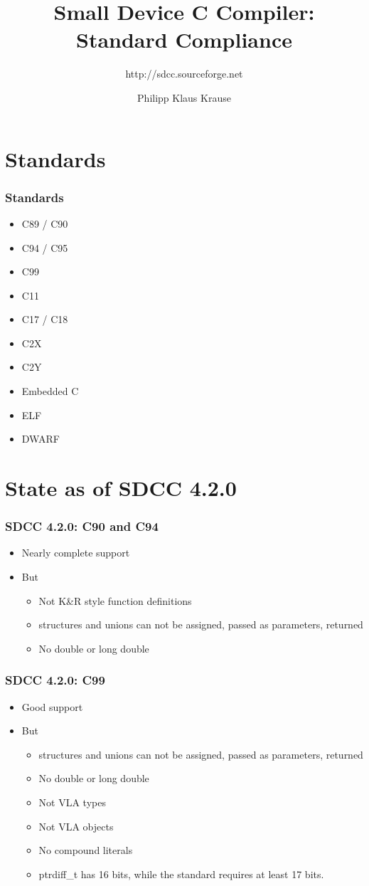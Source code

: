 \documentclass[xcolor=dvipsnames]{beamer}
\title{Small Device C Compiler: Standard Compliance}
\subtitle{http://sdcc.sourceforge.net}
\author{Philipp Klaus Krause}
\begin{document}
\begin{frame}
	\titlepage
\end{frame}

\section{Standards}

\begin{frame}
	\frametitle{Standards}
	\begin{itemize}
		\item C89 / C90
		\item C94 / C95
		\item C99
		\item C11
		\item C17 / C18
		\item C2X
		\item C2Y
		\item Embedded C
		\item ELF
		\item DWARF
	\end{itemize}
\end{frame}

\section{State as of SDCC 4.2.0}

\begin{frame}
	\frametitle{SDCC 4.2.0: C90 and C94}
	\begin{itemize}
		\item Nearly complete support
		\item But
		\begin{itemize}
			\item Not K\&R style function definitions
			\item structures and unions can not be assigned, passed as parameters, returned
			\item No double or long double
		\end{itemize}
	\end{itemize}
\end{frame}

\begin{frame}
	\frametitle{SDCC 4.2.0: C99}
	\begin{itemize}
		\item Good support
		\item But
		\begin{itemize}
			\item structures and unions can not be assigned, passed as parameters, returned
			\item No double or long double
			\item Not VLA types
			\item Not VLA objects
			\item No compound literals
			\item ptrdiff\_t has 16 bits, while the standard requires at least 17 bits.
		\end{itemize}
	\end{itemize}
\end{frame}
\end{document}
